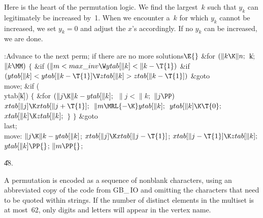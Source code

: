 Here is the heart of the permutation logic. We find the largest~$k$
such that $y_k$ can legitimately be increased by~1. When we encounter
a~$k$ for which $y_k$ cannot be increased, we set $y_k=0$ and adjust
the $x$'s accordingly. If no $y_k$ can be increased, we are done.

\Y\B\4:Advance to the next perm;  if there are no
more solutions\X${}\E{}$\6
\&{for} ${}(\|k\K\|n;{}$ \|k; ${}\|k\MM){}$\5
${}\{{}$\1\6
\&{if} ${}(\|m<\\{max\_inv}\W\\{ytab}[\|k]<\|k-\T{1}){}$\1\6
\&{if} ${}(\\{ytab}[\|k]<\\{ytab}[\|k-\T{1}]\V\\{ztab}[\|k]>\\{ztab}[\|k-%
\T{1}]){}$\1\5
\&{goto} \\{move};\2\2\6
\&{if} (\\{ytab}[\|k])\5
${}\{{}$\1\6
\&{for} ${}(\|j\K\|k-\\{ytab}[\|k];{}$ ${}\|j<\|k;{}$ ${}\|j\PP){}$\1\5
${}\\{xtab}[\|j]\K\\{xtab}[\|j+\T{1}];{}$\2\6
${}\|m\MRL{-{\K}}\\{ytab}[\|k];{}$\6
${}\\{ytab}[\|k]\K\T{0};{}$\6
${}\\{xtab}[\|k]\K\\{ztab}[\|k];{}$\6
\4${}\}{}$\2\6
\4${}\}{}$\2\6
\&{goto} \\{last};\6
\4\\{move}:\5
${}\|j\K\|k-\\{ytab}[\|k]{}$;\6
${}\\{xtab}[\|j]\K\\{xtab}[\|j-\T{1}]{}$;\5
${}\\{xtab}[\|j-\T{1}]\K\\{ztab}[\|k];{}$\6
${}\\{ytab}[\|k]\PP{}$;\5
${}\|m\PP{}$;\par
\U48.\fi

A permutation is encoded as a sequence of nonblank characters,
using an abbreviated copy of the  code from {\sc GB\_\,IO} and
omitting
the characters that need to be quoted within strings. If the
number of distinct elements in the multiset is at most~62, only digits
and letters will appear in the vertex name.

